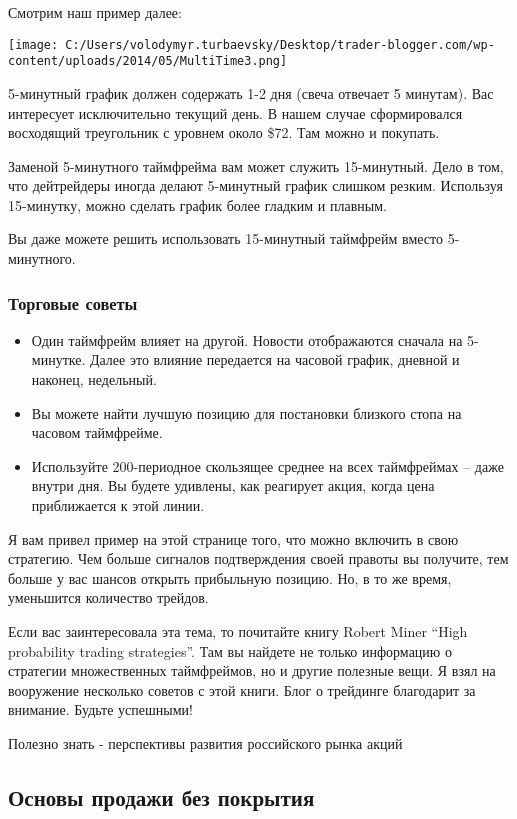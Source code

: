 \documentclass[a5paper]{article}
\begin{document}
Смотрим наш пример далее:

\texttt{[image: C:/Users/volodymyr.turbaevsky/Desktop/trader-blogger.com/wp-content/uploads/2014/05/MultiTime3.png]}

5-минутный график должен содержать 1-2 дня (свеча отвечает 5 минутам). Вас интересует исключительно текущий день. В нашем случае сформировался восходящий треугольник с уровнем около \$72. Там можно и покупать.

Заменой 5-минутного таймфрейма вам может служить 15-минутный. Дело в том, что дейтрейдеры иногда делают 5-минутный график слишком резким. Используя 15-минутку, можно сделать график более гладким и плавным.

Вы даже можете решить использовать 15-минутный таймфрейм вместо
5-минутного.

\subsubsection{Торговые советы}

\begin{itemize}
\item     Один таймфрейм влияет на другой. Новости отображаются сначала на 5-минутке. Далее это влияние передается на часовой график, дневной и наконец, недельный.
\item     Вы можете найти лучшую позицию для постановки близкого стопа на часовом таймфрейме.
\item     Используйте 200-периодное скользящее среднее на всех таймфреймах – даже внутри дня. Вы будете удивлены, как реагирует акция, когда цена приближается к этой линии.
\end{itemize}

Я вам привел пример на этой странице того, что можно включить в свою стратегию. Чем больше сигналов подтверждения своей правоты вы получите, тем больше у вас шансов открыть прибыльную позицию. Но, в то же время, уменьшится количество трейдов.

Если вас заинтересовала эта тема, то почитайте книгу Robert Miner “High probability trading strategies”. Там вы найдете не только информацию о стратегии множественных таймфреймов, но и другие полезные вещи. Я взял на вооружение несколько советов с этой книги. Блог о трейдинге благодарит за внимание. Будьте успешными!


Полезно знать - перспективы развития российского рынка акций

\subsection{Основы продажи без покрытия}
\end{document}
